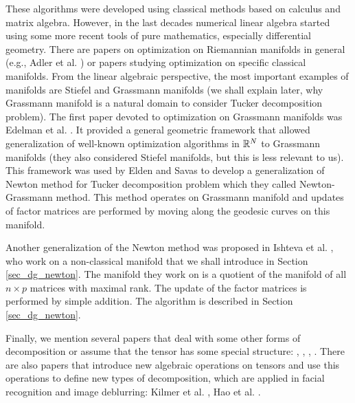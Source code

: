 These algorithms were developed using classical methods based 
on calculus and matrix algebra.  However, in the last decades
numerical linear algebra started using some more recent
tools of pure mathematics, especially differential geometry. There
are papers on optimization on Riemannian manifolds
in general (e.g., Adler et al. \cite{adler_spine}) or
papers studying optimization on specific classical manifolds. From the linear algebraic perspective, the most 
important examples of manifolds  are Stiefel 
and Grassmann manifolds (we shall explain later, why Grassmann manifold
is a natural domain to consider  Tucker decomposition
problem). The first paper devoted to optimization
on Grassmann manifolds was Edelman et al. \cite{edelman_1998}. It provided
a general geometric framework that allowed generalization
of well-known optimization algorithms in $\mathbb{R}^N$ to Grassmann manifolds (they also
considered Stiefel manifolds, but this is less relevant to us).
  This framework was used by Elden and Savas \cite{elden_savas_2009}
to develop a generalization of Newton method for Tucker decomposition problem which they 
called Newton-Grassmann method. This method operates on Grassmann manifold
and updates of factor matrices are performed by moving along the geodesic curves on this manifold.


Another generalization of the Newton method was proposed in Ishteva et al. \cite{IDLAVH09},
who work on a non-classical manifold that we shall introduce in Section \ref{sec_dg_newton}.
The manifold they work on is a quotient of the manifold of all $n \times p$ matrices
with maximal rank. The update of the factor matrices is performed
by simple addition. The algorithm is described in Section \ref{sec_dg_newton}.



Finally, we mention several papers that deal with some other forms
of decomposition or assume that the tensor has some special structure: \cite{elden_krylov},
\cite{badeau},  \cite{oseledets}, \cite{hao_horesh}.
There are also papers that introduce new algebraic operations on tensors and 
use this operations to define new types of decomposition, which are applied
in facial recognition and image deblurring: Kilmer et al. \cite{kilmer_3rd}, Hao et al. \cite{hao_kilmer}.
